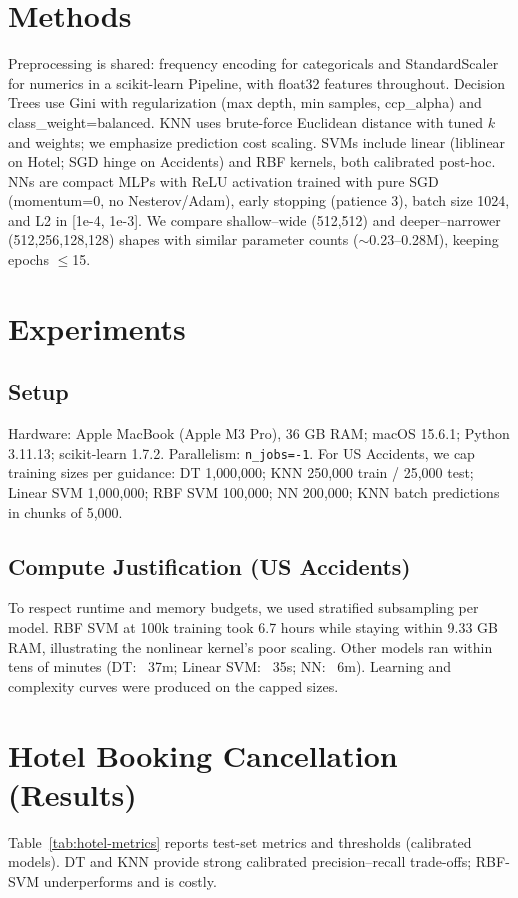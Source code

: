 \documentclass[conference]{IEEEtran}
\newcommand{\datasetA}{Hotel Booking Cancellation}
\newcommand{\datasetB}{US Accidents}
\begin{document}
\section{Methods}
Preprocessing is shared: frequency encoding for categoricals and StandardScaler for numerics in a scikit-learn Pipeline, with float32 features throughout. Decision Trees use Gini with regularization (max depth, min samples, ccp\_alpha) and class\_weight=balanced. KNN uses brute-force Euclidean distance with tuned $k$ and weights; we emphasize prediction cost scaling. SVMs include linear (liblinear on Hotel; SGD hinge on Accidents) and RBF kernels, both calibrated post-hoc. NNs are compact MLPs with ReLU activation trained with pure SGD (momentum=0, no Nesterov/Adam), early stopping (patience 3), batch size 1024, and L2 in [1e-4, 1e-3]. We compare shallow–wide (512,512) and deeper–narrower (512,256,128,128) shapes with similar parameter counts ($\sim$0.23–0.28M), keeping epochs $\leq$15.

\section{Experiments}
\subsection{Setup}
Hardware: Apple MacBook (Apple M3 Pro), 36 GB RAM; macOS 15.6.1; Python 3.11.13; scikit-learn 1.7.2. Parallelism: \texttt{n\_jobs=-1}. For \datasetB{}, we cap training sizes per guidance: DT 1{,}000{,}000; KNN 250{,}000 train / 25{,}000 test; Linear SVM 1{,}000{,}000; RBF SVM 100{,}000; NN 200{,}000; KNN batch predictions in chunks of 5{,}000.

\subsection{Compute Justification (\datasetB)}
To respect runtime and memory budgets, we used stratified subsampling per model. RBF SVM at 100k training took 6.7 hours while staying within 9.33 GB RAM, illustrating the nonlinear kernel's poor scaling. Other models ran within tens of minutes (DT: ~37m; Linear SVM: ~35s; NN: ~6m). Learning and complexity curves were produced on the capped sizes.

\section{\datasetA{} (Results)}
Table~\ref{tab:hotel-metrics} reports test-set metrics and thresholds (calibrated models). DT and KNN provide strong calibrated precision–recall trade-offs; RBF-SVM underperforms and is costly.
\end{document}
